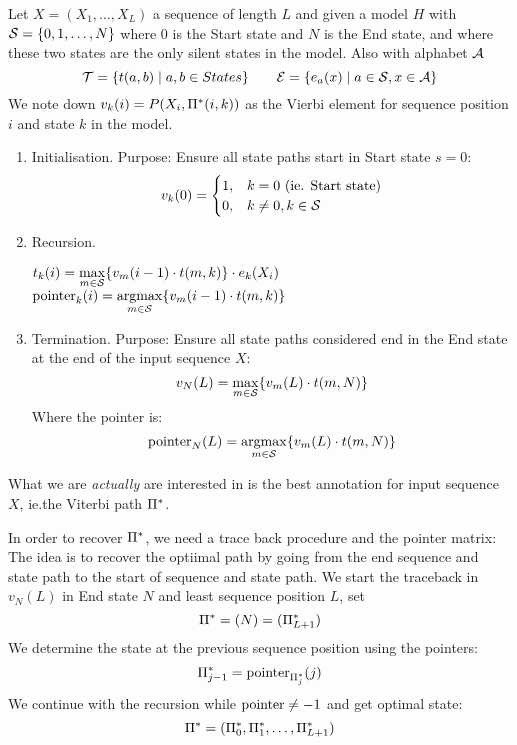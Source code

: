 \begin{definition}
Let \(X=(X_1,\dotsc,X_L)\) a sequence of length \(L\) and given a model \(H\)
with \(\mathcal{S}=\{0,1,\dotsc,N\}\) where \(0\) is the Start state and \(N\) is
the End state, and where these two states are the only silent states in the
model.  Also with alphabet \(\mathcal{A}\)
\[
    \mathcal{T} = \{ t(a,b) \mid a,b \in States \} \qquad
    \mathcal{E} = \{ e_a(x) \mid a \in \mathcal{S}, x\in\mathcal{A} \}
\]
We note down \(v_k(i) = P(X_i,\Pi^*(i,k))\) as the Vierbi element for
sequence position \(i\) and state \(k\) in the model.

\begin{enumerate}[label=(\alph*)]
\item Initialisation. Purpose: Ensure all state paths start in Start state
  \(s=0\):
  \[
      v_k(0) = \begin{cases}
          1, & k = 0 \text{ (ie. Start state)} \\
          0, & k \neq 0, k\in\mathcal{S}
      \end{cases}
  \]
\item Recursion.

\SetStartEndCondition{ (}{)}{)}
\SetAlgoBlockMarkers{}{\}}
\AlgoDisplayBlockMarkers\SetAlgoNoLine%
\begin{algorithm}
 {
     {
        $t_k(i) = \max\limits_{m\in\mathcal{S}} \{ v_m(i-1) \cdot t(m,k) \} \cdot e_k(X_i)$\;
        $\text{pointer}_k(i) = \operatorname*{argmax}\limits_{m\in\mathcal{S}} \{ v_m(i-1) \cdot t(m,k) \}$\;
    }
}
\end{algorithm}
\item Termination. Purpose: Ensure all state paths considered end in the End
  state at the end of the input sequence \(X\):
  \[
      v_N(L) = \max_{m\in\mathcal{S}} \{ v_m(L) \cdot t(m,N) \}
  \]
  Where the pointer is:
  \[
      \text{pointer}_N(L) = \operatorname*{argmax}_{m\in\mathcal{S}} \{ v_m(L) \cdot t(m,N) \}
  \]
\end{enumerate}
What we are \emph{actually} are interested in is the best annotation for input
sequence \(X\), ie.\@ the Viterbi path \(\Pi^*\).




In order to recover \(\Pi^*\), we need a trace back procedure and the pointer
matrix:
The idea is to recover the optiimal path by going from the end sequence and
state path to the start of sequence and state path.
We start the traceback in \(v_N(L)\) in End state \(N\) and least sequence
position \(L\), set
\[
    \Pi^* = (N) = (\Pi^*_{L+1})
\]
We determine the state at the previous sequence position using the pointers:
\[
    \Pi^*_{j-1} = \text{pointer}_{\Pi^*_j} (j)
\]
We continue with the recursion while \(\text{pointer}\neq -1\) and get optimal state:
\[
    \Pi^* = (\Pi^*_0, \Pi^*_1,\dotsc,\Pi^*_{L+1})
\]
\end{definition}


